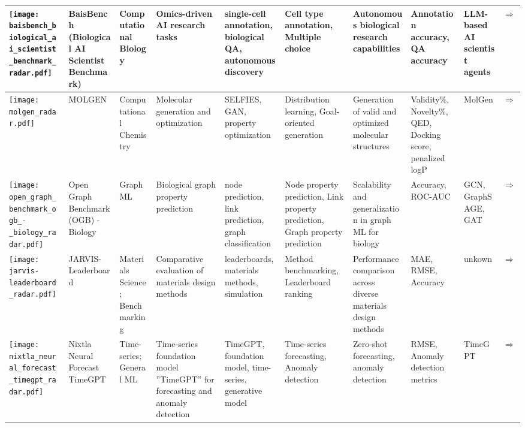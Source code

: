 \begin{landscape}
{\begin{longtable}{|p{}|p{}|p{}|p{}|p{}|p{}|p{}|p{}|p{}|p{}|}
\texttt{[image: baisbench\_biological\_ai\_scientist\_benchmark\_radar.pdf]} & BaisBench (Biological AI Scientist Benchmark) & Computational Biology & Omics-driven AI research tasks & single-cell annotation, biological QA, autonomous discovery & Cell type annotation, Multiple choice & Autonomous biological research capabilities & Annotation accuracy, QA accuracy & LLM-based AI scientist agents & \cite{luo2025benchmarkingaiscientistsomics}\href{https://arxiv.org/abs/2505.08341}{$\Rightarrow$} \\ \hline
\texttt{[image: molgen\_radar.pdf]} & MOLGEN & Computational Chemistry & Molecular generation and optimization & SELFIES, GAN, property optimization & Distribution learning, Goal-oriented generation & Generation of valid and optimized molecular structures & Validity\%, Novelty\%, QED, Docking score, penalized logP & MolGen & \cite{fang2024domainagnosticmoleculargenerationchemical}\href{https://github.com/zjunlp/MolGen}{$\Rightarrow$} \\ \hline
\texttt{[image: open\_graph\_benchmark\_ogb\_-\_biology\_radar.pdf]} & Open Graph Benchmark (OGB) - Biology & Graph ML & Biological graph property prediction & node prediction, link prediction, graph classification & Node property prediction, Link property prediction, Graph property prediction & Scalability and generalization in graph ML for biology & Accuracy, ROC-AUC & GCN, GraphSAGE, GAT & \cite{hu2021opengraphbenchmarkdatasets}\href{https://ogb.stanford.edu/docs/home/}{$\Rightarrow$} \\ \hline
\texttt{[image: jarvis-leaderboard\_radar.pdf]} & JARVIS-Leaderboard & Materials Science; Benchmarking & Comparative evaluation of materials design methods & leaderboards, materials methods, simulation & Method benchmarking, Leaderboard ranking & Performance comparison across diverse materials design methods & MAE, RMSE, Accuracy & unkown & \cite{choudhary2024jarvis}\href{https://arxiv.org/abs/2306.11688}{$\Rightarrow$} \\ \hline
\texttt{[image: nixtla\_neural\_forecast\_timegpt\_radar.pdf]} & Nixtla Neural Forecast TimeGPT & Time-series; General ML & Time-series foundation model ''TimeGPT'' for forecasting and anomaly detection & TimeGPT, foundation model, time-series, generative model & Time-series forecasting, Anomaly detection & Zero-shot forecasting, anomaly detection & RMSE, Anomaly detection metrics & TimeGPT & \cite{garza2024timegpt1}\href{https://github.com/Nixtla/neuralforecast}{$\Rightarrow$} \\ \hline

\end{longtable}}
\end{landscape}
